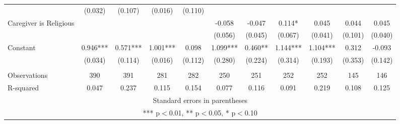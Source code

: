 \begin{tabular}{lcccccccccc}
 & (0.032) & (0.107) & (0.016) & (0.110) &  &  &  &  &  &  \\
Caregiver is Religious &  &  &  &  & -0.058 & -0.047 & 0.114* & 0.045 & 0.044 & 0.045 \\
 &  &  &  &  & (0.056) & (0.045) & (0.067) & (0.041) & (0.101) & (0.040) \\
Constant & 0.946*** & 0.571*** & 1.001*** & 0.098 & 1.099*** & 0.460** & 1.144*** & 1.104*** & 0.312 & -0.093 \\
 & (0.034) & (0.114) & (0.016) & (0.112) & (0.280) & (0.224) & (0.314) & (0.193) & (0.353) & (0.142) \\
 &  &  &  &  &  &  &  &  &  &  \\
Observations & 390 & 391 & 281 & 282 & 250 & 251 & 252 & 252 & 145 & 146 \\
 R-squared & 0.047 & 0.237 & 0.115 & 0.154 & 0.077 & 0.116 & 0.091 & 0.219 & 0.108 & 0.125 \\ \hline
\multicolumn{11}{c}{ Standard errors in parentheses} \\
\multicolumn{11}{c}{ *** p$<$0.01, ** p$<$0.05, * p$<$0.10} \\
\end{tabular}
